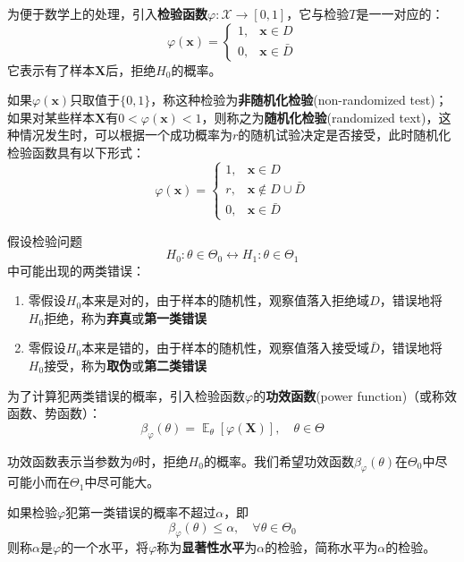 \documentclass{ctexbook}
\DeclareMathOperator{\E}{\mathbb{E}}     %
\begin{document}
\begin{definition}[检验函数]
    为便于数学上的处理，引入\textbf{检验函数}$\varphi:\mathcal{X} \to[0,1]$，它与检验$T$是一一对应的：
    $$\varphi(\mathbf{x})=\begin{cases}
        1,&\mathbf{x}\in D\\
        0,&\mathbf{x}\in \bar{D}
    \end{cases}$$
    它表示有了样本$\mathbf{X}$后，拒绝$H_0$的概率。
    
    如果$\varphi(\mathbf{x})$只取值于$\{0,1\}$，称这种检验为\textbf{非随机化检验}(non-randomized test)；如果对某些样本$\mathbf{X}$有$0<\varphi(\mathbf{x})<1$，则称之为\textbf{随机化检验}(randomized text)，这种情况发生时，可以根据一个成功概率为$r$的随机试验决定是否接受，此时随机化检验函数具有以下形式：
    $$\varphi(\mathbf{x})=\begin{cases}
        1,&\mathbf{x}\in D\\
        r,&\mathbf{x}\notin D\cup \bar{D}\\
        0,&\mathbf{x}\in \bar{D}
    \end{cases}$$
\end{definition}

\begin{definition}[功效函数]
    假设检验问题
    $$H_0:\theta\in\Theta_0\leftrightarrow H_1:\theta\in\Theta_1$$
    中可能出现的两类错误：\begin{enumerate}
        \item 零假设$H_0$本来是对的，由于样本的随机性，观察值落入拒绝域$D$，错误地将$H_0$拒绝，称为\textbf{弃真}或\textbf{第一类错误}
        \item 零假设$H_0$本来是错的，由于样本的随机性，观察值落入接受域$\bar{D}$，错误地将$H_0$接受，称为\textbf{取伪}或\textbf{第二类错误}
    \end{enumerate}
    为了计算犯两类错误的概率，引入检验函数$\varphi$的\textbf{功效函数}(power function)（或称效函数、势函数）：
    $$\beta_\varphi(\theta)=\E_\theta[\varphi(\mathbf{X})],\quad \theta\in\Theta$$
\end{definition}

功效函数表示当参数为$\theta$时，拒绝$H_0$的概率。我们希望功效函数$\beta_\varphi(\theta)$在$\Theta_0$中尽可能小而在$\Theta_1$中尽可能大。

\begin{definition}[检验水平]
    如果检验$\varphi$犯第一类错误的概率不超过$\alpha$，即
    $$\beta_\varphi(\theta)\le \alpha,\quad\forall\theta\in\Theta_0$$
    则称$\alpha$是$\varphi$的一个水平，将$\varphi$称为\textbf{显著性水平}为$\alpha$的检验，简称水平为$\alpha$的检验。
\end{definition}
\end{document}
